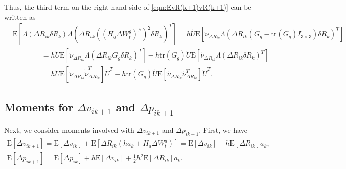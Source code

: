 \documentclass[10pt]{article}
\newcommand{\tr}[1]{\ensuremath{\mathrm{tr}\left( #1 \right)}}
\newcommand{\expect}[1]{\ensuremath{\mathrm{E}\left[ #1 \right]}}
\begin{document}
Thus, the third term on the right hand side of \eqref{eqn:EvR(k+1)vR(k+1)} can be written as
\begin{align}
	&\expect{\Lambda\left( \Delta R_{ik} \delta R_k \right) \Lambda\left( \Delta R_{ik} ((H_g\Delta W_t^g)^\wedge)^2 \delta R_k \right)^T} = h\tilde{U} \expect{\tilde{\nu}_{\Delta R_{ik}} \Lambda\left( \Delta R_{ik} (G_g-\tr{G_g}I_{3\times 3}) \delta R_k \right)^T} \nonumber \\
	&\qquad \qquad = h\tilde{U} \expect{\tilde{\nu}_{\Delta R_{ik}} \Lambda\left( \Delta R_{ik}G_g\delta R_k \right)^T} - h\tr{G_g}\tilde{U} \expect{\tilde{\nu}_{\Delta R_{ik}} \Lambda\left( \Delta R_{ik}\delta R_k \right)^T} \nonumber \\
	&\qquad \qquad = h\tilde{U}\expect{ \tilde{\nu}_{\Delta R_{ik}} \tilde{\tilde{\nu}}_{\Delta R_{ik}}^T }\tilde{U}^T - h\tr{G_g}\tilde{U} \expect{\tilde{\nu}_{\Delta R_{ik}} \tilde{\nu}_{\Delta R_{ik}}^T} \tilde{U}^T.
\end{align}

\subsection{Moments for $\Delta v_{ik+1}$ and $\Delta p_{ik+1}$}
Next, we consider moments involved with $\Delta v_{ik+1}$ and $\Delta p_{ik+1}$.
First, we have
\color{blue}
\begin{gather}
	\expect{\Delta v_{ik+1}} = \expect{\Delta v_{ik}} + \expect{\Delta R_{ik}(ha_k + H_a\Delta W_t^a)} = \expect{\Delta v_{ik}} + h\expect{\Delta R_{ik}}a_k, \\
	\expect{\Delta p_{ik+1}} = \expect{\Delta p_{ik}} + h\expect{\Delta v_{ik}} + \tfrac{1}{2}h^2\expect{\Delta R_{ik}}a_k.
\end{gather}
\color{black}
\end{document}
